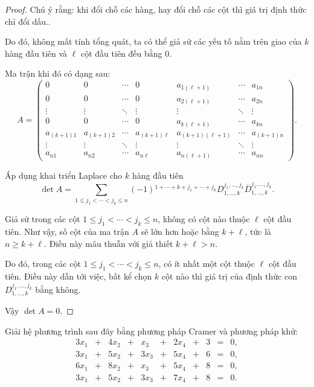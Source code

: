 \documentclass[class=linear-algebra,crop=false]{standalone}
\begin{document}
\begin{proof}
	\par Chú ý rằng: khi đổi chỗ các hàng, hay đổi chỗ các cột thì giá trị định thức chỉ đổi dấu..
	\par Do đó, không mất tính tổng quát, ta có thể giả sử các yếu tố nằm trên giao của $k$ hàng đầu tiên và $\ell$ cột đầu tiên đều bằng 0.
	\par Ma trận khi đó có dạng sau:
	\[
		A=
		\begin{pmatrix}
			0          & 0          & \cdots & 0             & a_{1(\ell+1)}     & \cdots & a_{1n}     \\
			0          & 0          & \cdots & 0             & a_{2(\ell+1)}     & \cdots & a_{2n}     \\
			\vdots     & \vdots     & \ddots & \vdots        & \vdots            & \ddots & \vdots     \\
			0          & 0          & \cdots & 0             & a_{k(\ell+1)}     & \cdots & a_{kn}     \\
			a_{(k+1)1} & a_{(k+1)2} & \cdots & a_{(k+1)\ell} & a_{(k+1)(\ell+1)} & \cdots & a_{(k+1)n} \\
			\vdots     & \vdots     & \ddots & \vdots        & \vdots            & \ddots & \vdots     \\
			a_{n1}     & a_{n2}     & \cdots & a_{n\ell}     & a_{n(\ell+1)}     & \cdots & a_{nn}
		\end{pmatrix}.
	\]
	\par Áp dụng khai triển Laplace cho $k$ hàng đầu tiên
	\[
		\det A = \sum_{1\le j_{1} < \cdots < j_{k}\le n}(-1){}^{1+\cdots+k+j_{1}+\cdots+j_{k}}D_{1,\ldots,k}^{j_{1},\ldots,j_{k}}\overline{D}_{1,\ldots,k}^{j_{1},\ldots,j_{k}}.
	\]
	\par Giả sử trong các cột $1\le j_{1} < \cdots < j_{k}\le n$, không có cột nào thuộc $\ell$ cột đầu tiên. Như vậy, số cột của ma trận $A$ sẽ lớn hơn hoặc bằng $k + \ell$, tức là $n \ge k + \ell$. Điều này mâu thuẫn với giả thiết $k + \ell > n$.
	\par Do đó, trong các cột $1\le j_{1} < \cdots < j_{k}\le n$, có ít nhất một cột thuộc $\ell$ cột đầu tiên. Điều này dẫn tới việc, bất kể chọn $k$ cột nào thì giá trị của định thức con  $D^{j_{1},\ldots,j_{k}}_{1,\ldots,k}$ bằng không.
	\par Vậy $\det A = 0$.
\end{proof}

\begin{exercise}
	\par Giải hệ phương trình sau đây bằng phương pháp Cramer và phương pháp khử:
	\[
		\begin{array}{ccccccccccc}
			3x_{1} & + & 4x_{2} & + & x_{3}  & + & 2x_{4} & + & 3 & = & 0, \\
			3x_{1} & + & 5x_{2} & + & 3x_{3} & + & 5x_{4} & + & 6 & = & 0, \\
			6x_{1} & + & 8x_{2} & + & x_{3}  & + & 5x_{4} & + & 8 & = & 0, \\
			3x_{1} & + & 5x_{2} & + & 3x_{3} & + & 7x_{4} & + & 8 & = & 0.
		\end{array}
	\]
\end{exercise}
\end{document}
